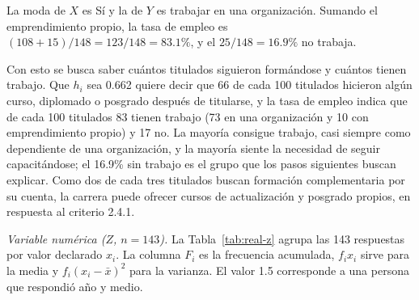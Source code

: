 \documentclass[12pt, a4paper]{article}
\begin{document}
La moda de $X$ es Sí y la de $Y$ es trabajar en una organización.
Sumando el emprendimiento propio, la tasa de empleo es $(108+15)/148 =
123/148 = 83.1\%$, y el $25/148 = 16.9\%$ no trabaja.

Con esto se busca saber cuántos titulados siguieron formándose y
cuántos tienen trabajo. Que $h_i$ sea 0.662 quiere decir que 66 de cada
100 titulados hicieron algún curso, diplomado o posgrado después de
titularse, y la tasa de empleo indica que de cada 100 titulados 83 tienen
trabajo (73 en una organización y 10 con emprendimiento propio) y 17 no.
La mayoría consigue trabajo, casi siempre como dependiente de una
organización, y la mayoría siente la necesidad de seguir capacitándose;
el 16.9\% sin trabajo es el grupo que los pasos siguientes buscan
explicar. Como dos de cada tres titulados buscan formación complementaria
por su cuenta, la carrera puede ofrecer cursos de actualización y
posgrado propios, en respuesta al criterio 2.4.1.

\textit{Variable numérica ($Z$, $n = 143$).} La
Tabla~\ref{tab:real-z} agrupa las 143 respuestas por valor declarado
$x_i$. La columna $F_i$ es la frecuencia acumulada, $f_i x_i$ sirve para la
media y $f_i (x_i - \bar{x})^2$ para la varianza. El valor 1.5 corresponde
a una persona que respondió año y medio.
\end{document}
